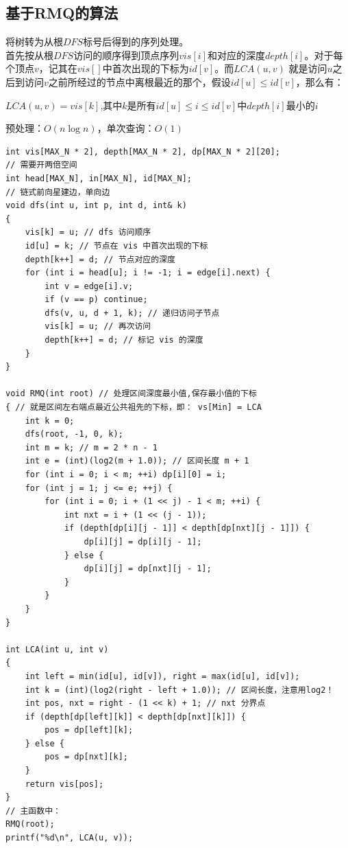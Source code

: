 \subsection{基于RMQ的算法}
将树转为从根$DFS$标号后得到的序列处理。 \\
首先按从根$DFS$访问的顺序得到顶点序列$vis[i]$和对应的深度$depth[i]$。对于每个顶点$v$，记其在$vis[]$中首次出现的下标为$id[v]$。而$LCA(u,v)$ 就是访问$u$之后到访问$v$之前所经过的节点中离根最近的那个，假设$id[u]\leq id[v]$，那么有：
\begin{center}
$LCA(u,v)=vis[k]$,其中$k$是所有$id[u]\leq i \leq id[v]$中$depth[i]$最小的$i$
\end{center}
预处理：$O(n\log n)$，单次查询：$O(1)$
\begin{lstlisting}
int vis[MAX_N * 2], depth[MAX_N * 2], dp[MAX_N * 2][20];
// 需要开两倍空间
int head[MAX_N], in[MAX_N], id[MAX_N];
// 链式前向星建边，单向边
void dfs(int u, int p, int d, int& k)
{
	vis[k] = u; // dfs 访问顺序
   	id[u] = k; // 节点在 vis 中首次出现的下标
	depth[k++] = d; // 节点对应的深度
	for (int i = head[u]; i != -1; i = edge[i].next) {
		int v = edge[i].v;
		if (v == p) continue;
		dfs(v, u, d + 1, k); // 递归访问子节点
		vis[k] = u; // 再次访问
		depth[k++] = d; // 标记 vis 的深度
	}
}

void RMQ(int root) // 处理区间深度最小值,保存最小值的下标
{ // 就是区间左右端点最近公共祖先的下标，即： vs[Min] = LCA
	int k = 0;
	dfs(root, -1, 0, k);
	int m = k; // m = 2 * n - 1
	int e = (int)(log2(m + 1.0)); // 区间长度 m + 1
	for (int i = 0; i < m; ++i) dp[i][0] = i;
	for (int j = 1; j <= e; ++j) {
		for (int i = 0; i + (1 << j) - 1 < m; ++i) {
			int nxt = i + (1 << (j - 1));
			if (depth[dp[i][j - 1]] < depth[dp[nxt][j - 1]]) {
				dp[i][j] = dp[i][j - 1];
			} else {
				dp[i][j] = dp[nxt][j - 1];
			}
		}
	}
}

int LCA(int u, int v)
{
	int left = min(id[u], id[v]), right = max(id[u], id[v]);
	int k = (int)(log2(right - left + 1.0)); // 区间长度，注意用log2！
	int pos, nxt = right - (1 << k) + 1; // nxt 分界点
	if (depth[dp[left][k]] < depth[dp[nxt][k]]) {
		pos = dp[left][k];
	} else {
		pos = dp[nxt][k];
	}
	return vis[pos];
}
// 主函数中：
RMQ(root);
printf("%d\n", LCA(u, v));
\end{lstlisting}

